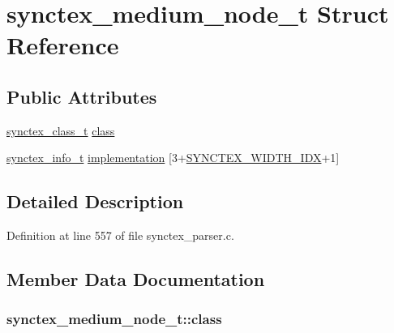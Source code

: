 \hypertarget{structsynctex__medium__node__t}{\section{synctex\+\_\+medium\+\_\+node\+\_\+t Struct Reference}
\label{structsynctex__medium__node__t}
}
\subsection*{Public Attributes}
\begin{DoxyCompactItemize}
\item 
\hyperlink{synctex__parser_8c_a68d11a2cb22716e7abd35cffed7d54c5}{synctex\+\_\+class\+\_\+t} \hyperlink{structsynctex__medium__node__t_a885844606d2a24a66d0b0eb3ff6606f0}{class}
\item 
\hyperlink{synctex__parser_8c_a864f981cdab43a24765efb685074cf70}{synctex\+\_\+info\+\_\+t} \hyperlink{structsynctex__medium__node__t_a9860ddefe84048ba9dbefa320b90444f}{implementation} \mbox{[}3+\hyperlink{synctex__parser_8c_af612be38d4b567957eb402599cb4a2a4}{S\+Y\+N\+C\+T\+E\+X\+\_\+\+W\+I\+D\+T\+H\+\_\+\+I\+D\+X}+1\mbox{]}
\end{DoxyCompactItemize}


\subsection{Detailed Description}


Definition at line 557 of file synctex\+\_\+parser.\+c.



\subsection{Member Data Documentation}
\hypertarget{structsynctex__medium__node__t_a885844606d2a24a66d0b0eb3ff6606f0}{
\subsubsection[{class}]{ synctex\+\_\+medium\+\_\+node\+\_\+t\+::class}}\label{structsynctex__medium__node__t_a885844606d2a24a66d0b0eb3ff6606f0}


